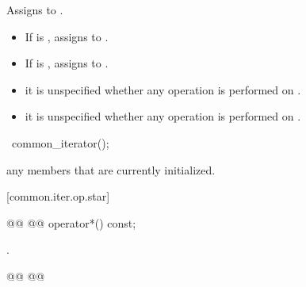 \begin{addedblock}
\begin{itemdescr}
\pnum
\effects Assigns  to .
\begin{itemize}
\item If  is , assigns  to .
\item If  is , assigns  to .
\end{itemize}

\newtxt{
\remarks}
\begin{itemize}
\item {} it is unspecified whether any operation
is performed on .
\item {} it is unspecified whether any operation
is performed on .
\end{itemize}

\pnum
\returns {}
\end{itemdescr}

%
\begin{itemdecl}
~common_iterator();
\end{itemdecl}

\begin{itemdescr}
\pnum
\effects
{} any members that are currently initialized.
\end{itemdescr}

[common.iter.op.star]{}

%
%
\begin{itemdecl}
@@
@@ operator*() const;
\end{itemdecl}

\begin{itemdescr}
\pnum
\requires {}

\pnum
{} .
\end{itemdescr}

{\color{newclr}
%
%
\begin{itemdecl}
@\newtxt{\seebelow}@ @@
\end{itemdecl}

}
\end{addedblock}
